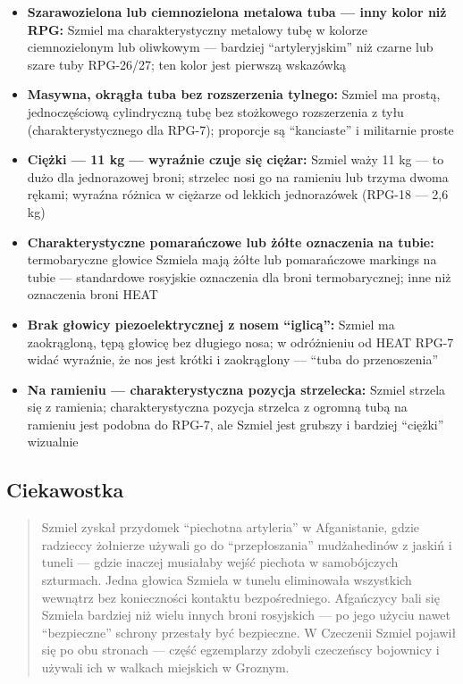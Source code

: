 \documentclass[12pt,oneside]{book}
\providecommand{\tightlist}{%
  \setlength{\itemsep}{0pt}\setlength{\parskip}{0pt}}
\begin{document}
\begin{itemize}
\tightlist
\item
  \textbf{Szarawozielona lub ciemnozielona metalowa tuba --- inny kolor
  niż RPG:} Szmiel ma charakterystyczny metalowy tubę w kolorze
  ciemnozielonym lub oliwkowym --- bardziej ``artyleryjskim'' niż czarne
  lub szare tuby RPG-26/27; ten kolor jest pierwszą wskazówką
\item
  \textbf{Masywna, okrągła tuba bez rozszerzenia tylnego:} Szmiel ma
  prostą, jednoczęściową cylindryczną tubę bez stożkowego rozszerzenia z
  tyłu (charakterystycznego dla RPG-7); proporcje są ``kanciaste'' i
  militarnie proste
\item
  \textbf{Ciężki --- 11 kg --- wyraźnie czuje się ciężar:} Szmiel waży
  11 kg --- to dużo dla jednorazowej broni; strzelec nosi go na ramieniu
  lub trzyma dwoma rękami; wyraźna różnica w ciężarze od lekkich
  jednorazówek (RPG-18 --- 2,6 kg)
\item
  \textbf{Charakterystyczne pomarańczowe lub żółte oznaczenia na tubie:}
  termobaryczne głowice Szmiela mają żółte lub pomarańczowe markings na
  tubie --- standardowe rosyjskie oznaczenia dla broni termobarycznej;
  inne niż oznaczenia broni HEAT
\item
  \textbf{Brak głowicy piezoelektrycznej z nosem ``iglicą'':} Szmiel ma
  zaokrągloną, tępą głowicę bez długiego nosa; w odróżnieniu od HEAT
  RPG-7 widać wyraźnie, że nos jest krótki i zaokrąglony --- ``tuba do
  przenoszenia''
\item
  \textbf{Na ramieniu --- charakterystyczna pozycja strzelecka:} Szmiel
  strzela się z ramienia; charakterystyczna pozycja strzelca z ogromną
  tubą na ramieniu jest podobna do RPG-7, ale Szmiel jest grubszy i
  bardziej ``ciężki'' wizualnie
\end{itemize}

\subsection{Ciekawostka}\label{ciekawostka-92}

\begin{quote}
Szmiel zyskał przydomek ``piechotna artyleria'' w Afganistanie, gdzie
radzieccy żołnierze używali go do ``przepłoszania'' mudżahedinów z
jaskiń i tuneli --- gdzie inaczej musiałaby wejść piechota w
samobójczych szturmach. Jedna głowica Szmiela w tunelu eliminowała
wszystkich wewnątrz bez konieczności kontaktu bezpośredniego. Afgańczycy
bali się Szmiela bardziej niż wielu innych broni rosyjskich --- po jego
użyciu nawet ``bezpieczne'' schrony przestały być bezpieczne. W
Czeczenii Szmiel pojawił się po obu stronach --- część egzemplarzy
zdobyli czeczeńscy bojownicy i używali ich w walkach miejskich w
Groznym.
\end{quote}
\end{document}
